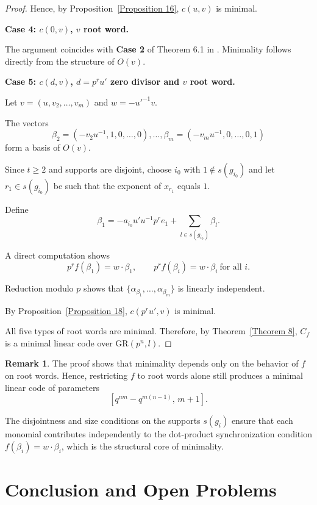 \documentclass[10pt]{article}
\theoremstyle{definition}
\newtheorem{remark}[lem]{Remark}
\begin{document}
\begin{proof}
Hence, by Proposition~\ref{Proposition 16},
$c(u,v)$ is minimal.

\medskip
\noindent
\textbf{Case 4: $c(0,v)$, $v$ root word.}

The argument coincides with
{\bf Case 2} of Theorem 6.1 in \cite{WuLuCao}.
Minimality follows directly from the structure
of $O(v)$.

\medskip
\noindent
\textbf{Case 5: $c(d,v)$, $d=p^ru'$ zero divisor and $v$ root word.}

Let $v=(u,v_2,\dots,v_m)$
and $w=-u'^{-1}v$.

The vectors
\[
\beta_2=(-v_2u^{-1},1,0,\dots,0),\dots,
\beta_m=(-v_mu^{-1},0,\dots,0,1)
\]
form a basis of $O(v)$.

Since $t\ge 2$ and supports are disjoint,
choose $i_0$ with $1\notin s(g_{i_0})$
and let $r_1\in s(g_{i_0})$ be such that
the exponent of $x_{r_1}$ equals $1$.

Define
\[
\beta_1=
-a_{i_0} u'u^{-1} p^r e_1
+
\sum_{l\in s(g_{i_0})} \beta_l.
\]

A direct computation shows
\[
p^r f(\beta_1)=w\cdot \beta_1,
\qquad
p^r f(\beta_i)=w\cdot \beta_i
\ \text{for all } i.
\]

Reduction modulo $p$ shows that
$\{\alpha_{\beta_1},\dots,\alpha_{\beta_m}\}$
is linearly independent.

By Proposition~\ref{Proposition 18},
$c(p^ru',v)$ is minimal.

\medskip

All five types of root words are minimal.
Therefore, by Theorem~\ref{Theorem 8},
$C_f$ is a minimal linear code over $\mathrm{GR}(p^n,l)$.
\end{proof}

\begin{remark}
The proof shows that minimality depends only on the behavior
of $f$ on root words.
Hence, restricting $f$ to root words alone
still produces a minimal linear code of parameters
\[
[q^{nm}-q^{m(n-1)},\,m+1].
\]

The disjointness and size conditions on the supports $s(g_i)$
ensure that each monomial contributes independently
to the dot-product synchronization condition
$f(\beta_i)=w\cdot\beta_i$,
which is the structural core of minimality.
\end{remark}


\section{Conclusion and Open Problems}\label{sec:conclusion}
\end{document}
